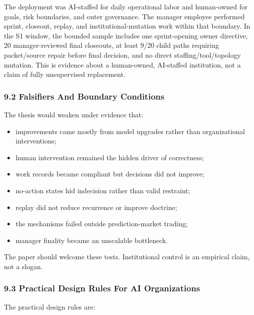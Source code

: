 \documentclass[
]{article}
\providecommand{\tightlist}{%
  \setlength{\itemsep}{0pt}\setlength{\parskip}{0pt}}
\begin{document}
The deployment was AI-staffed for daily operational labor and human-owned for goals, risk boundaries, and outer governance. The manager employee performed sprint, closeout, replay, and institutional-mutation work within that boundary. In the S1 window, the bounded sample includes one sprint-opening owner directive, 20 manager-reviewed final closeouts, at least 9/20 child paths requiring packet/source repair before final decision, and no direct staffing/tool/topology mutation. This is evidence about a human-owned, AI-staffed institution, not a claim of fully unsupervised replacement.

\subsubsection{9.2 Falsifiers And Boundary Conditions}\label{falsifiers-and-boundary-conditions}

The thesis would weaken under evidence that:

\begin{itemize}
\tightlist
\item
  improvements came mostly from model upgrades rather than organizational interventions;
\item
  human intervention remained the hidden driver of correctness;
\item
  work records became compliant but decisions did not improve;
\item
  no-action states hid indecision rather than valid restraint;
\item
  replay did not reduce recurrence or improve doctrine;
\item
  the mechanisms failed outside prediction-market trading;
\item
  manager finality became an unscalable bottleneck.
\end{itemize}

The paper should welcome these tests. Institutional control is an empirical claim, not a slogan.

\subsubsection{9.3 Practical Design Rules For AI Organizations}\label{practical-design-rules-for-ai-organizations}

The practical design rules are:
\end{document}
